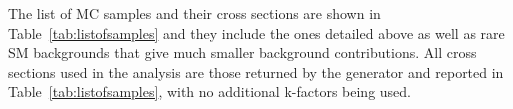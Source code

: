 
The list of MC samples and their cross sections are shown in Table~\ref{tab:listofsamples}
and they include the ones detailed above as well as rare SM backgrounds that give much smaller background contributions.
All cross sections used in the analysis are those returned by the generator and reported in Table~\ref{tab:listofsamples}, with no additional k-factors being used.

